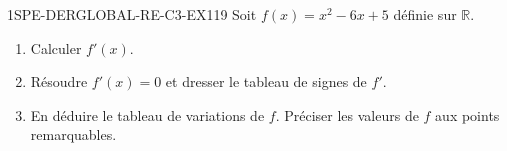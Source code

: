

\begin{exercice}{1SPE-DERGLOBAL-RE-C3-EX1}{1}{9}
Soit $f(x) = x^2 - 6x + 5$ définie sur $\mathbb{R}$.
\begin{enumerate}
  \item Calculer $f'(x)$.
  \item Résoudre $f'(x) = 0$ et dresser le tableau de signes de $f'$.
  \item En déduire le tableau de variations de $f$. Préciser les valeurs de $f$ aux points remarquables.
\end{enumerate}
\end{exercice}



